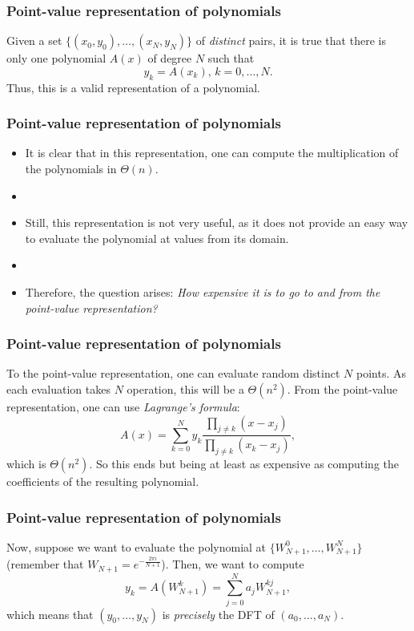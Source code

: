 \documentclass{beamer}
\begin{document}
\begin{frame}
    \frametitle{Point-value representation of polynomials}
    Given a set $\{\left( x_0,y_0 \right) ,\ldots,\left( x_N,y_N \right) \} $ of \emph{distinct} pairs, it is true that there is only one polynomial $A(x)$ of degree $N$ such that \[
	y_k = A(x_k),\, k = 0,\ldots ,N
    .\] Thus, this is a valid representation of a polynomial.
\end{frame}

\begin{frame}
    \frametitle{Point-value representation of polynomials}
    \begin{itemize}
        \item It is clear that in this representation, one can compute the multiplication of the polynomials in $\Theta\left( n \right) $.
	\item
	\item Still, this representation is not very useful, as it does not provide an easy way to evaluate the polynomial at values from its domain.
	\item
	\item Therefore, the question arises: \emph{How expensive it is to go to and from the point-value representation?}
    \end{itemize}
\end{frame}

\begin{frame}
    \frametitle{Point-value representation of polynomials}
    To the point-value representation, one can evaluate random distinct $N$ points. As each evaluation takes $N$ operation, this will be a $\Theta\left( n^2 \right) $.
    \linebreak \linebreak
    From the point-value representation, one can use \emph{Lagrange's formula}: \[
	A(x) = \sum_{k=0}^{N} y_k \frac{\prod_{j\neq k} \left( x-x_j \right)  }{\prod_{j\neq k} \left( x_k-x_j \right)}
    ,\] which is $\Theta\left( n^2 \right) $.
    So this ends but being at least as expensive as computing the coefficients of the resulting polynomial.
\end{frame}

\begin{frame}
    \frametitle{Point-value representation of polynomials}
    Now, suppose we want to evaluate the polynomial at $\{W_{N+1}^{0},\ldots,W_{N+1}^{N}\} $ (remember that $W_{N+1} = e^{-\frac{2\pi i}{N+1}}$). Then, we want to compute \[
    y_k = A\left( W_{N+1}^{k} \right) = \sum_{j=0}^{N} a_j W_{N+1}^{kj}
    ,\] which means that $\left( y_0,\ldots,y_N \right)$ is \emph{precisely} the DFT of $\left( a_0,\ldots,a_N \right) $.
\end{frame}
\end{document}
